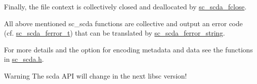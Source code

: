 Finally, the file context is collectively closed and deallocated by \mbox{\hyperlink{sc__scda_8h_ad547d1af82bca7b524b39d363fa8a903}{sc\+\_\+scda\+\_\+fclose}}.

All above mentioned sc\+\_\+scda functions are collective and output an error code (cf. \mbox{\hyperlink{sc__scda_8h_a3613f101cd3d474bae0609313c45a135}{sc\+\_\+scda\+\_\+ferror\+\_\+t}}) that can be translated by \mbox{\hyperlink{sc__scda_8h_a1191840fde06a11537122a5701a75eef}{sc\+\_\+scda\+\_\+ferror\+\_\+string}}.

For more details and the option for encoding metadata and data see the functions in \mbox{\hyperlink{sc__scda_8h}{sc\+\_\+scda.\+h}}.

\begin{DoxyWarning}{Warning}
The scda API will change in the next libsc version! 
\end{DoxyWarning}
